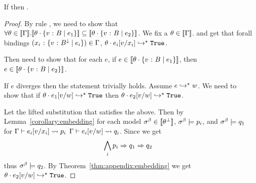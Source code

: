 \begin{lemma}
If 
then .
\end{lemma}
\begin{proof}
By rule \rsubbase, we need to show that
$\forall \sub\in\interp{\env}.
  \interp{\applysub{\sub}{\tref{v}{\btyp}{\refa_1}}}
  \subseteq
  \interp{\applysub{\sub}{\tref{v}{\btyp}{\refa_2}}}$.
%
We fix a $\sub\in\interp{\env}$.
and get that forall bindings
$(\tbind{x_i}{\tref{v}{\btyp^{\downarrow}}{\refa_i}}) \in \env$,
$\evalsto{\applysub{\sub}{e_i\subst{v}{x_i}}}{\etrue}$.

Then need to show that for each $e$,
if $e \in \interp{\applysub{\sub}{\tref{v}{\btyp}{\refa_1}}}$,
then $e \in \interp{\applysub{\sub}{\tref{v}{\btyp}{\refa_2}}}$.

If $e$ diverges then the statement trivially holds.
Assume $\evalsto{e}{w}$.
We need to show that
if $\evalsto{\applysub{\sub}{e_1\subst{v}{w}}}{\etrue}$
then $\evalsto{\applysub{\sub}{e_2\subst{v}{w}}}{\etrue}$.

Let \vsub the lifted substitution that satisfies the above.
Then  by Lemma~\ref{corollary:embedding}
for each model $\bmodel \in \interp{\vsub}$,
$\bmodel\models\pred_i$, and $\bmodel\models q_1$
for
$\tologicshort{\env}{e_i\subst{v}{x_i}}{\btyp}{\pred_i}{\embed{\btyp}}{\smtenv_i}{\axioms_i}$
$\tologicshort{\env}{e_i\subst{v}{w}}{\btyp}{q_i}{\embed{\btyp}}{\smtenv_i}{\beta_i}$.
%
Since  we get
$$
\bigwedge_i \pred_i
\Rightarrow q_1 \Rightarrow q_2
$$
thus $\bmodel\models q_2$.
%
By Theorem~\ref{thm:appendix:embedding} we get $\evalsto{\applysub{\sub}{\refa_2\subst{v}{w}}}{\etrue}$.
\end{proof}

